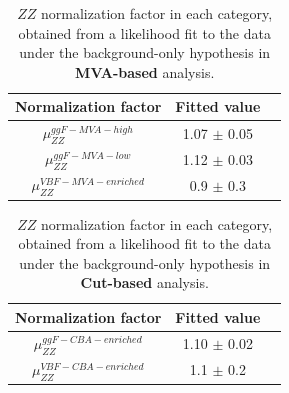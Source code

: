\begin{table}[htbp]
  \centering
    \caption{$ZZ$ normalization factor in each category, obtained from a likelihood fit to the data under the background-only hypothesis in \textbf{MVA-based} analysis.}
  \label{tab:muZZ_bonly_dnn}
  \small
  \begin{spacing}{1.0}
  \begin{tabular}{ccc}
    \toprule
    Normalization factor  & Fitted value \\
    \midrule
    $\mu_{ZZ}^{ggF-MVA-high}$  & 1.07 $\pm$ 0.05 \\
    \hline
    $\mu_{ZZ}^{ggF-MVA-low}$   & 1.12 $\pm$ 0.03 \\
    \hline
    $\mu_{ZZ}^{VBF-MVA-enriched}$  & 0.9 $\pm$ 0.3 \\
    \bottomrule
  \end{tabular}
  \end{spacing}
\end{table}

\begin{table}[htbp]
  \centering
    \caption{$ZZ$ normalization factor in each category, obtained from a likelihood fit to the data under the background-only hypothesis in \textbf{Cut-based} analysis.}
  \label{tab:muZZ_bonly_cut}
  \small
  \begin{spacing}{1.0}
  \begin{tabular}{ccc}
    \toprule
    Normalization factor  & Fitted value \\
    \midrule
    $\mu_{ZZ}^{ggF-CBA-enriched}$  & 1.10 $\pm$ 0.02 \\
    \hline
    $\mu_{ZZ}^{VBF-CBA-enriched}$  & 1.1 $\pm$ 0.2 \\
    \bottomrule
  \end{tabular}
  \end{spacing}
\end{table}


